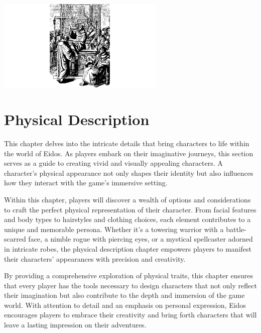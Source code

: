 \documentclass[12pt]{book}
\begin{document}
\begin{center}
    \includegraphics[width=0.6\textwidth]{./images/religion06.pdf}
\end{center}



\chapter{Physical Description}

This chapter delves into the intricate details that bring characters to life within the world of Eidos. As players embark on their imaginative journeys, this section serves as a guide to creating vivid and visually appealing characters. A character's physical appearance not only shapes their identity but also influences how they interact with the game's immersive setting.

Within this chapter, players will discover a wealth of options and considerations to craft the perfect physical representation of their character. From facial features and body types to hairstyles and clothing choices, each element contributes to a unique and memorable persona. Whether it's a towering warrior with a battle-scarred face, a nimble rogue with piercing eyes, or a mystical spellcaster adorned in intricate robes, the physical description chapter empowers players to manifest their characters' appearances with precision and creativity.

By providing a comprehensive exploration of physical traits, this chapter ensures that every player has the tools necessary to design characters that not only reflect their imagination but also contribute to the depth and immersion of the game world. With attention to detail and an emphasis on personal expression, Eidos encourages players to embrace their creativity and bring forth characters that will leave a lasting impression on their adventures.
\end{document}
